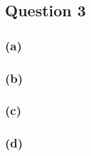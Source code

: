 \subsection*{Question 3}

\subsubsection*{(a)}


\subsubsection*{(b)}


\subsubsection*{(c)}


\subsubsection*{(d)}


